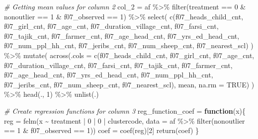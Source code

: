 \documentclass[
]{article}
\newenvironment{Shaded}{\begin{snugshade}}{\end{snugshade}}
\newcommand{\AttributeTok}[1]{\textcolor[rgb]{0.77,0.63,0.00}{#1}}
\newcommand{\CommentTok}[1]{\textcolor[rgb]{0.56,0.35,0.01}{\textit{#1}}}
\newcommand{\ConstantTok}[1]{\textcolor[rgb]{0.00,0.00,0.00}{#1}}
\newcommand{\ControlFlowTok}[1]{\textcolor[rgb]{0.13,0.29,0.53}{\textbf{#1}}}
\newcommand{\DecValTok}[1]{\textcolor[rgb]{0.00,0.00,0.81}{#1}}
\newcommand{\FunctionTok}[1]{\textcolor[rgb]{0.00,0.00,0.00}{#1}}
\newcommand{\NormalTok}[1]{#1}
\newcommand{\OtherTok}[1]{\textcolor[rgb]{0.56,0.35,0.01}{#1}}
\newcommand{\SpecialCharTok}[1]{\textcolor[rgb]{0.00,0.00,0.00}{#1}}
\begin{document}
\begin{Shaded}
\begin{Highlighting}[]
\CommentTok{\# Getting mean values for column 2}
\NormalTok{col\_2 }\OtherTok{=}\NormalTok{ af }\SpecialCharTok{\%\textgreater{}\%} 
  \FunctionTok{filter}\NormalTok{(treatment }\SpecialCharTok{==} \DecValTok{0} \SpecialCharTok{\&}\NormalTok{ nonoutlier }\SpecialCharTok{==} \DecValTok{1} \SpecialCharTok{\&}\NormalTok{ f07\_observed }\SpecialCharTok{==} \DecValTok{1}\NormalTok{) }\SpecialCharTok{\%\textgreater{}\%} 
  \FunctionTok{select}\NormalTok{(}
    \FunctionTok{c}\NormalTok{(f07\_heads\_child\_cnt, f07\_girl\_cnt, f07\_age\_cnt, f07\_duration\_village\_cnt,}
\NormalTok{                   f07\_farsi\_cnt,  f07\_tajik\_cnt,  f07\_farmer\_cnt, }
\NormalTok{                   f07\_age\_head\_cnt, f07\_yrs\_ed\_head\_cnt, f07\_num\_ppl\_hh\_cnt, f07\_jeribs\_cnt, }
\NormalTok{                   f07\_num\_sheep\_cnt, f07\_nearest\_scl)}
\NormalTok{  ) }\SpecialCharTok{\%\textgreater{}\%} 
  \FunctionTok{mutate}\NormalTok{(}
  \FunctionTok{across}\NormalTok{(}\AttributeTok{.cols =} \FunctionTok{c}\NormalTok{(f07\_heads\_child\_cnt, f07\_girl\_cnt, f07\_age\_cnt, f07\_duration\_village\_cnt,}
\NormalTok{                   f07\_farsi\_cnt,  f07\_tajik\_cnt,  f07\_farmer\_cnt, }
\NormalTok{                   f07\_age\_head\_cnt, f07\_yrs\_ed\_head\_cnt, f07\_num\_ppl\_hh\_cnt, f07\_jeribs\_cnt, }
\NormalTok{                   f07\_num\_sheep\_cnt, f07\_nearest\_scl), mean, }\AttributeTok{na.rm =} \ConstantTok{TRUE}\NormalTok{)}
\NormalTok{  ) }\SpecialCharTok{\%\textgreater{}\%} \FunctionTok{head}\NormalTok{(., }\DecValTok{1}\NormalTok{) }\SpecialCharTok{\%\textgreater{}\%} \FunctionTok{unlist}\NormalTok{(.)}



\CommentTok{\# Create regression functions for column 3}
\NormalTok{reg\_function\_coef }\OtherTok{=} \ControlFlowTok{function}\NormalTok{(x)\{}
\NormalTok{    reg }\OtherTok{=} \FunctionTok{felm}\NormalTok{(x }\SpecialCharTok{\textasciitilde{}}\NormalTok{ treatment }\SpecialCharTok{|} \DecValTok{0} \SpecialCharTok{|} \DecValTok{0} \SpecialCharTok{|}\NormalTok{ clustercode, }
               \AttributeTok{data =}\NormalTok{ af }\SpecialCharTok{\%\textgreater{}\%} \FunctionTok{filter}\NormalTok{(nonoutlier }\SpecialCharTok{==} \DecValTok{1} \SpecialCharTok{\&}\NormalTok{ f07\_observed }\SpecialCharTok{==} \DecValTok{1}\NormalTok{))}
\NormalTok{    coef }\OtherTok{=} \FunctionTok{coef}\NormalTok{(reg)[}\DecValTok{2}\NormalTok{]}
    \FunctionTok{return}\NormalTok{(coef)}
\NormalTok{\}}



\end{Highlighting}
\end{Shaded}
\end{document}
